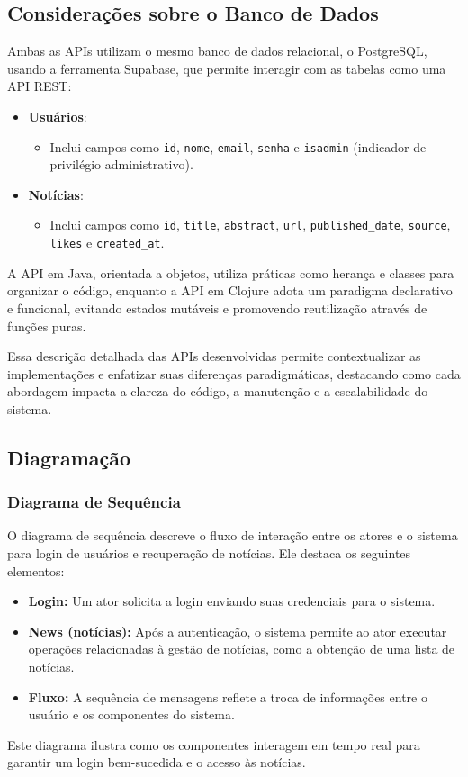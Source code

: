 \subsection{Considerações sobre o Banco de Dados}
Ambas as APIs utilizam o mesmo banco de dados relacional, o PostgreSQL, usando a ferramenta Supabase, que permite interagir com as tabelas como uma API REST:
\begin{itemize}
    \item \textbf{Usuários}:
    \begin{itemize}
        \item Inclui campos como \texttt{id}, \texttt{nome}, \texttt{email}, \texttt{senha} e \texttt{isadmin} (indicador de privilégio administrativo).
    \end{itemize}
    \item \textbf{Notícias}:
    \begin{itemize}
        \item Inclui campos como \texttt{id}, \texttt{title}, \texttt{abstract}, \texttt{url}, \texttt{published\_date}, \texttt{source}, \texttt{likes} e \texttt{created\_at}.
    \end{itemize}
\end{itemize}

A API em Java, orientada a objetos, utiliza práticas como herança e classes para organizar o código, enquanto a API em Clojure adota um paradigma declarativo e funcional, evitando estados mutáveis e promovendo reutilização através de funções puras.

Essa descrição detalhada das APIs desenvolvidas permite contextualizar as implementações e enfatizar suas diferenças paradigmáticas, destacando como cada abordagem impacta a clareza do código, a manutenção e a escalabilidade do sistema.


\subsection{Diagramação}

\subsubsection{Diagrama de Sequência}

O diagrama de sequência descreve o fluxo de interação entre os atores e o sistema para login de usuários e recuperação de notícias. Ele destaca os seguintes elementos:
\begin{itemize}
    \item \textbf{Login:} Um ator solicita a login enviando suas credenciais para o sistema.
    \item \textbf{News (notícias):} Após a autenticação, o sistema permite ao ator executar operações relacionadas à gestão de notícias, como a obtenção de uma lista de notícias.
    \item \textbf{Fluxo:} A sequência de mensagens reflete a troca de informações entre o usuário e os componentes do sistema.
\end{itemize}
Este diagrama ilustra como os componentes interagem em tempo real para garantir um login bem-sucedida e o acesso às notícias.

